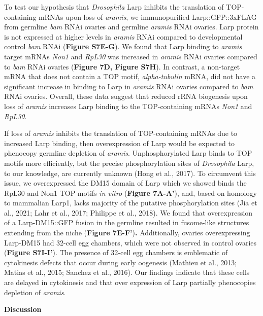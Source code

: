 \documentclass[12pt,twoside]{reedthesis}
\begin{document}
To test our hypothesis that \emph{Drosophila} Larp inhibits the translation
of TOP-containing mRNAs upon loss of \emph{aramis}, we immunopurified
Larp::GFP::3xFLAG from germline \emph{bam} RNAi ovaries and germline \emph{aramis}
RNAi ovaries. Larp protein is not expressed at higher levels in \emph{aramis}
RNAi compared to developmental control \emph{bam} RNAi (\textbf{Figure S7E-G}). We
found that Larp binding to \emph{aramis} target mRNAs \emph{Non1} and \emph{RpL30} was
increased in \emph{aramis} RNAi ovaries compared to \emph{bam} RNAi ovaries
(\textbf{Figure 7D, Figure S7H}). In contrast, a non-target mRNA that does
not contain a TOP motif, \emph{alpha-tubulin} mRNA, did not have a
significant increase in binding to Larp in \emph{aramis} RNAi ovaries
compared to \emph{bam} RNAi ovaries. Overall, these data suggest that reduced
rRNA biogenesis upon loss of \emph{aramis} increases Larp binding to the
TOP-containing mRNAs \emph{Non1} and \emph{RpL30}.

If loss of \emph{aramis} inhibits the translation of TOP-containing mRNAs due
to increased Larp binding, then overexpression of Larp would be expected
to phenocopy germline depletion of \emph{aramis}. Unphosphorylated Larp binds
to TOP motifs more efficiently, but the precise phosphorylation sites of
\emph{Drosophila} Larp, to our knowledge, are currently unknown
(Hong et al., 2017). To circumvent this issue, we overexpressed the DM15
domain of Larp which we showed binds the RpL30 and Non1 TOP motifs \emph{in
vitro} (\textbf{Figure 7A-A'}), and, based on homology to mammalian Larp1,
lacks majority of the putative phosphorylation sites
(Jia et al., 2021; Lahr et al., 2017; Philippe et al., 2018). We found that overexpression of a
Larp-DM15::GFP fusion in the germline resulted in fusome-like structures
extending from the niche (\textbf{Figure 7E-F'})\textbf{.} Additionally, ovaries
overexpressing Larp-DM15 had 32-cell egg chambers, which were not
observed in control ovaries (\textbf{Figure S7I-I'}). The presence of 32-cell
egg chambers is emblematic of cytokinesis defects that occur during
early oogenesis (Mathieu et al., 2013; Matias et al., 2015; Sanchez et al., 2016). Our
findings indicate that these cells are delayed in cytokinesis and that
over expression of Larp partially phenocopies depletion of \emph{aramis}.

\textbf{Discussion}
\end{document}
